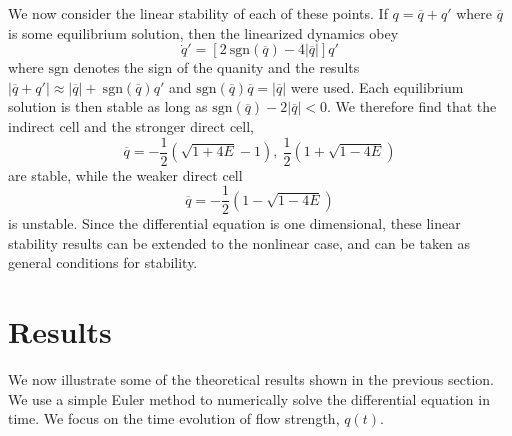 \documentclass[letterpaper, 11pt]{article}
\begin{document}
We now consider the linear stability of each of these points. If $q = \overline{q} + q'$ where $\overline{q}$ is some equilibrium solution, then the linearized dynamics obey
\begin{equation}
\dot{q}' = \left[ 2 \ \mathrm{sgn}(\overline{q}) - 4 |\overline{q}| \right] q'
\end{equation}
where $\mathrm{sgn}$ denotes the sign of the quanity and the results $|\overline{q} + q'| \approx |\overline{q}| + \ \mathrm{sgn}(\overline{q}) q'$ and $\mathrm{sgn}(\overline{q}) \overline{q} = |\overline{q}|$ were used. Each equilibrium solution is then stable as long as $\mathrm{sgn}(\overline{q}) - 2|\overline{q}| < 0$. We therefore find that the indirect cell and the stronger direct cell, 
\begin{equation*}
\overline{q} = -\frac{1}{2} \left( \sqrt{1 + 4E} - 1\right), \ \frac{1}{2} \left(1 + \sqrt{1 - 4E} \right)
\end{equation*}
are stable, while the weaker direct cell
\begin{equation*}
\overline{q} = -\frac{1}{2} \left(1 - \sqrt{1 - 4E}\right)
\end{equation*}
is unstable. Since the differential equation is one dimensional, these linear stability results can be extended to the nonlinear case, and can be taken as general conditions for stability.


\section{Results}

We now illustrate some of the theoretical results shown in the previous section. We use a simple Euler method to numerically solve the differential equation in time. We focus on the time evolution of flow strength, $q(t)$.
\end{document}
